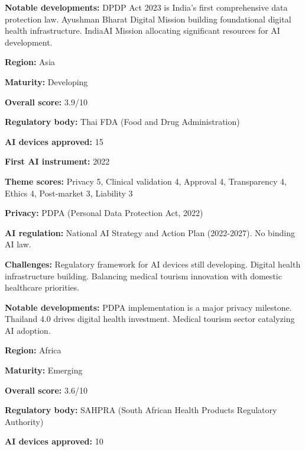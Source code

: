 \noindent\textbf{Notable developments:} DPDP Act 2023 is India's first comprehensive data protection law. Ayushman Bharat Digital Mission building foundational digital health infrastructure. IndiaAI Mission allocating significant resources for AI development.\par
\vspace{0.55em}
\par
\vspace{0.15em}
\noindent\textbf{Region:} Asia\par
\noindent\textbf{Maturity:} Developing\par
\noindent\textbf{Overall score:} 3.9/10\par
\noindent\textbf{Regulatory body:} Thai FDA (Food and Drug Administration)\par
\noindent\textbf{AI devices approved:} 15\par
\noindent\textbf{First AI instrument:} 2022\par
\noindent\textbf{Theme scores:} Privacy 5, Clinical validation 4, Approval 4, Transparency 4, Ethics 4, Post-market 3, Liability 3\par
\noindent\textbf{Privacy:} PDPA (Personal Data Protection Act, 2022)\par
\noindent\textbf{AI regulation:} National AI Strategy and Action Plan (2022-2027). No binding AI law.\par
\noindent\textbf{Challenges:} Regulatory framework for AI devices still developing. Digital health infrastructure building. Balancing medical tourism innovation with domestic healthcare priorities.\par
\noindent\textbf{Notable developments:} PDPA implementation is a major privacy milestone. Thailand 4.0 drives digital health investment. Medical tourism sector catalyzing AI adoption.\par
\vspace{0.55em}
\par
\vspace{0.15em}
\noindent\textbf{Region:} Africa\par
\noindent\textbf{Maturity:} Emerging\par
\noindent\textbf{Overall score:} 3.6/10\par
\noindent\textbf{Regulatory body:} SAHPRA (South African Health Products Regulatory Authority)\par
\noindent\textbf{AI devices approved:} 10\par
